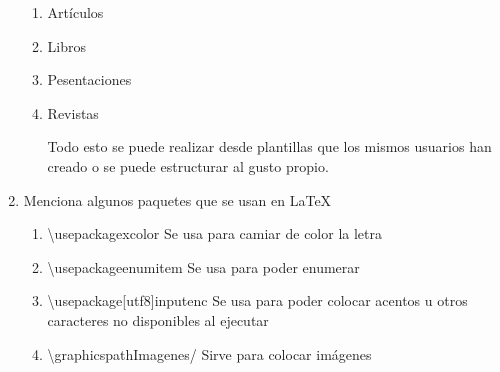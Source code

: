 \documentclass[letterpaper, 12pt, oneside]{article}%
\begin{document}
\begin{enumerate}
		\begin{enumerate}
			\item 
			Artículos
			\item 
			Libros
			\item 
			Pesentaciones
			\item 
			Revistas
			
		Todo esto se puede realizar desde plantillas que los mismos usuarios han creado o se puede estructurar al gusto propio.
		\end{enumerate}
		\item 
		Menciona algunos paquetes que se usan en LaTeX\\
		\begin{enumerate}
			\item 
			\textbackslash usepackage{xcolor} Se usa para camiar de color la letra
			\item
			\textbackslash usepackage{enumitem} Se usa para poder enumerar
			\item 
			\textbackslash usepackage[utf8]{inputenc} Se usa para poder colocar acentos u otros caracteres no disponibles al ejecutar
			\item
			\textbackslash graphicspath{{Imagenes/}} Sirve para colocar imágenes 
		\end{enumerate}


\end{enumerate}
\end{document}
